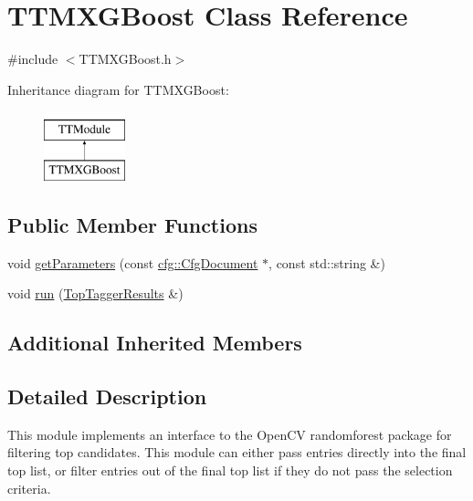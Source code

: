 \hypertarget{classTTMXGBoost}{\section{T\-T\-M\-X\-G\-Boost Class Reference}
\label{classTTMXGBoost}
}


{\ttfamily \#include $<$T\-T\-M\-X\-G\-Boost.\-h$>$}

Inheritance diagram for T\-T\-M\-X\-G\-Boost\-:\begin{figure}[H]
\begin{center}
\leavevmode
\includegraphics[height=2.000000cm]{classTTMXGBoost}
\end{center}
\end{figure}
\subsection*{Public Member Functions}
\begin{DoxyCompactItemize}
\item 
void \hyperlink{classTTMXGBoost_a852aba8afb6f453187871e232927e622}{get\-Parameters} (const \hyperlink{classcfg_1_1CfgDocument}{cfg\-::\-Cfg\-Document} $\ast$, const std\-::string \&)
\item 
void \hyperlink{classTTMXGBoost_afd522be937c0e1c8226c83cc6888c666}{run} (\hyperlink{classTopTaggerResults}{Top\-Tagger\-Results} \&)
\end{DoxyCompactItemize}
\subsection*{Additional Inherited Members}


\subsection{Detailed Description}
This module implements an interface to the Open\-C\-V randomforest package for filtering top candidates. This module can either pass entries directly into the final top list, or filter entries out of the final top list if they do not pass the selection criteria.


